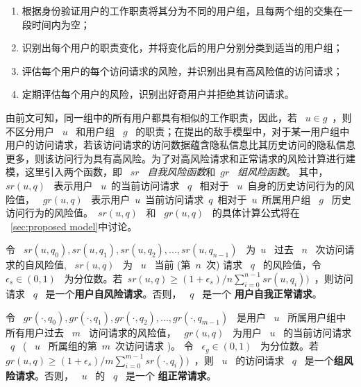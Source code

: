\begin{enumerate}
	\item 根据身份验证用户的工作职责将其分为不同的用户组，且每两个组的交集在一段时间内为空；
	\item 识别出每个用户的职责变化，并将变化后的用户分别分类到适当的用户组；
	\item 评估每个用户的每个访问请求的风险，并识别出具有高风险值的访问请求；
	\item 定期评估每个用户的风险，识别出好奇用户并拒绝其访问请求。
\end{enumerate}

由前文可知，同一组中的所有用户都具有相似的工作职责，因此，若 ~$u \in g$~，则不区分用户 ~$u$~ 和用户组 ~$g$~ 的职责；在提出的敌手模型中，对于某一用户组中用户的访问请求，若该访问请求的访问数据蕴含隐私信息比其历史访问的隐私信息更多，则该访问行为具有高风险。为了对高风险请求和正常请求的风险计算进行建模，这里引入两个函数，即 ~$sr$~ \emph{自我风险函数}和~$gr$~ \emph{组风险函数}。 其中，~$sr(u,q)$~ 表示用户 ~$u$~的当前访问请求 ~$q$~ 相对于 ~$u$~自身的历史访问行为的风险值， ~$gr(u,q)$~ 表示用户~$u$~当前访问请求~$q$~相对于~$u$~所属用户组 ~$g$~ 历史访问行为的风险值。~$sr(u,q)$~ 和 ~$gr(u,q)$~ 的具体计算公式将在 ~\ref{sec:proposed model}中讨论。

\begin{definition}%
	\label{def_self_risky}
	令 ~$sr(u, q_0), sr(u, q_1), sr(u, q_2), ... ,sr(u, q_{n-1})$~ 为~$u$~ 过去 ~$n$~ 次访问请求的自风险值, ~$sr(u,q)$~ 为 ~$u$~ 当前 (第~$n$~次) 请求 ~$q$~ 的风险值，令 ~$\epsilon_s \in (0,1)$~ 为分位数。若~$sr(u,q) \geq  (1+\epsilon_s) / n  \sum ^{n-1}_{i=0}{sr(u,q_i))}$~，则访问请求 ~$q$~ 是一个\textbf{用户自风险请求}。否则， ~$q$~ 是一个 \textbf{用户自我正常请求}。
\end{definition}

\begin{definition}%
	\label{def_group_risky}
	令 ~$gr(\cdot, q_0), gr(\cdot, q_1), gr(\cdot, q_2), ... , gr(\cdot, q_{m-1})$~ 是用户 ~$u$~ 所属用户组中所有用户过去 ~$m$~ 访问请求的风险值， ~$gr(u,q)$~ 为用户 ~$u$~ 的当前访问请求 ~$q$~  ( ~$u$~ 所属组的第~$m$~次访问请求 )。 令 ~$\epsilon_g \in (0,1)$~ 为分位数。若~$gr(u,q) \geq  (1+\epsilon_s) / m  \sum ^{m-1}_{i=0}{sr(\cdot,q_i))}$~，则 ~$u$~ 的访问请求 ~$q$~ 是一个\textbf{组风险请求}。否则， ~$u$~ 的 ~$q$~ 是一个 \textbf{组正常请求}。
\end{definition}


